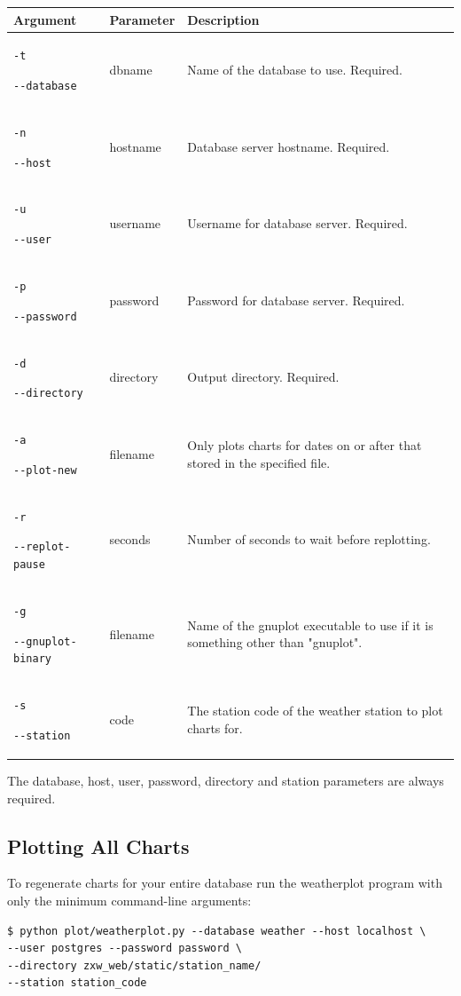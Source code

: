 \documentclass[a4paper,10pt,draft]{book}
\begin{document}
\begin{tabular}{p{3.4cm} l p{8cm}}
\hline
\textbf{Argument} & \textbf{Parameter} & \textbf{Description} \\
\hline
\verb|-t| \par \verb|--database| & dbname & Name of the database to use. Required. \\
\verb|-n| \par \verb|--host| & hostname & Database server hostname. Required. \\
\verb|-u| \par \verb|--user| & username & Username for database server. Required. \\
\verb|-p| \par \verb|--password| & password & Password for database server. Required. \\
\verb|-d| \par \verb|--directory| & directory & Output directory. Required. \\
\verb|-a| \par \verb|--plot-new| & filename & Only plots charts for dates on or after that stored in the specified file. \\
\verb|-r| \par \verb|--replot-pause| & seconds & Number of seconds to wait before replotting.\\
\verb|-g| \par \verb|--gnuplot-binary| & filename & Name of the gnuplot executable to use if it is something other than "gnuplot".\\
\verb|-s| \par \verb|--station| & code & The station code of the weather station to plot charts for.\\
\hline
\end{tabular}

The database, host, user, password, directory and station parameters are always required.

\subsection{Plotting All Charts}

To regenerate charts for your entire database run the weatherplot program with only the minimum command-line arguments:

\begin{verbatim}
$ python plot/weatherplot.py --database weather --host localhost \
--user postgres --password password \
--directory zxw_web/static/station_name/
--station station_code
\end{verbatim}
\end{document}
